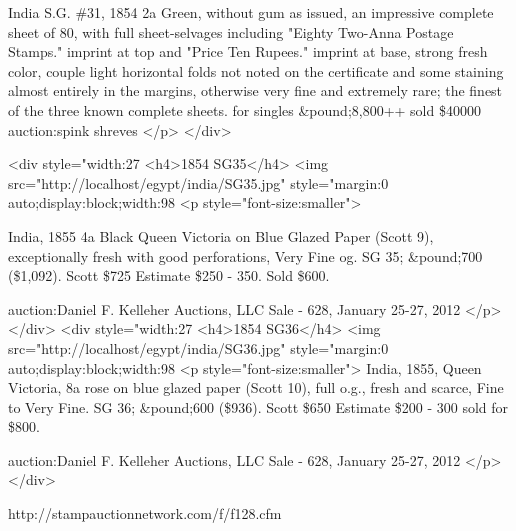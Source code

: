 \documentclass[10pt,justified,oneside,a4paper]{tufte-book}     %
\begin{document}
India
S.G. \#31, 1854 2a Green, without gum as issued, an impressive complete sheet of 80, with full sheet-selvages including "Eighty Two-Anna Postage Stamps." imprint at top and "Price Ten Rupees." imprint at base, strong fresh color, couple light horizontal folds not noted on the certificate and some staining almost entirely in the margins, otherwise very fine and extremely rare; the finest of the three known complete sheets.
 for singles &pound;8,800++ sold \$40000
auction:spink shreves
</p>
</div>


<div style="width:27%
<h4>1854 SG35</h4>
<img src="http://localhost/egypt/india/SG35.jpg"  style="margin:0 auto;display:block;width:98%
<p style="font-size:smaller"> 

India, 1855 4a Black Queen Victoria on Blue Glazed Paper (Scott 9), exceptionally fresh with good perforations, Very Fine og. 
SG 35; &pound;700 (\$1,092). 
Scott \$725 Estimate \$250 - 350. Sold \$600.

auction:Daniel F. Kelleher Auctions, LLC Sale - 628, January 25-27, 2012
</p>
</div>
<div style="width:27%
<h4>1854 SG36</h4>
<img src="http://localhost/egypt/india/SG36.jpg"  style="margin:0 auto;display:block;width:98%
<p style="font-size:smaller"> 
India, 1855, Queen Victoria, 8a rose on blue glazed paper (Scott 10), full o.g., fresh and scarce, Fine to Very Fine. 
SG 36; &pound;600 (\$936). 
Scott \$650 Estimate \$200 - 300 sold for \$800.

auction:Daniel F. Kelleher Auctions, LLC Sale - 628, January 25-27, 2012
</p>
</div>

http://stampauctionnetwork.com/f/f128.cfm                              
\end{document}
